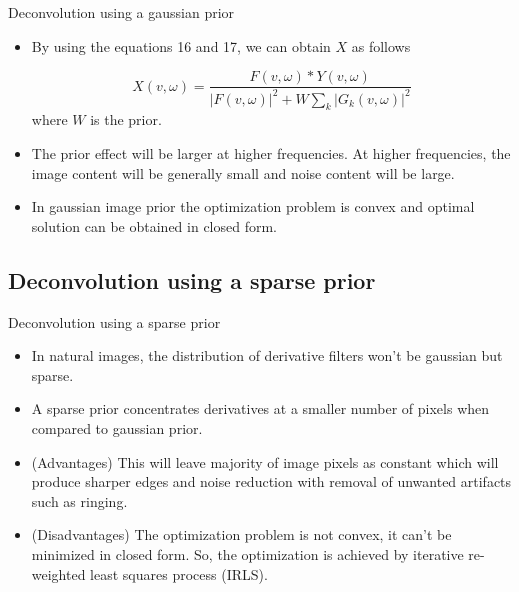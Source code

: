 \documentclass{beamer}
\begin{document}
\begin{frame}{Deconvolution using a gaussian prior}
  \begin{itemize}
  \item {
   By using the equations 16 and 17, we can obtain $X$ as follows

\begin{equation}
X(v,\omega) = \frac{F(v,\omega)*Y(v,\omega)}{|F(v,\omega)|^2 + W \sum_k|G_k(v,\omega)|^2}
\end{equation}
where $W$ is the prior. \pause %
  }
  \item {
  	The prior effect will be larger at higher frequencies. At higher frequencies, the image content will be generally small and noise content will be large.
  }
  \item {
  	In gaussian image prior the optimization problem is convex and optimal solution can be obtained in closed form.
  }
  \end{itemize}
\end{frame}

\subsection{Deconvolution using a sparse prior}
\begin{frame}{Deconvolution using a sparse prior}
  \begin{itemize}
  \item {
   In natural images, the distribution of derivative filters won't be gaussian but sparse.
  }
  \item {   
    A sparse prior concentrates derivatives at a smaller number of pixels when compared to gaussian prior.
  }
  \item {
  	(Advantages) This will leave majority of image pixels as constant which will produce \alert{sharper edges and noise reduction} with removal of unwanted artifacts such as ringing.
  }
  \item {
  	(Disadvantages) The optimization problem is \alert{not convex}, it can't be minimized in closed form. So, the optimization is achieved by iterative re-weighted least squares process (IRLS).
  }
  \end{itemize}
\end{frame}
\end{document}
